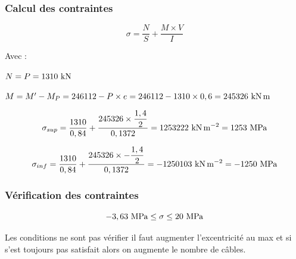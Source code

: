 \documentclass[12pt,a4paper]{article}
\newcommand{\sgma}[1]{\sigma_{#1}}
\begin{document}
	\begin{center}
	\end{center}

	
	
	
	\subsubsection{Calcul des contraintes}
	
	\[ \sigma = \dfrac{N}{S} + \dfrac{M \times V}{I} \]
	
	Avec :
	
	$N = P = 1310\kn$

	$M = M' - M_{P} = 246112 - P \times e = 246112 - 1310 \times 0,6 = 245326\knxm$
	
	\[ \sgma{sup}  = \dfrac{1310}{0,84} + \dfrac{245326 \times \dfrac{1,4}{2}}{0,1372} = 1253222\knms = 1253\mpa \]
	
	\[ \sgma{inf}  = \dfrac{1310}{0,84} + \dfrac{245326 \times -\dfrac{1,4}{2}}{0,1372} = -1250103\knms = -1250\mpa \]
	
	\subsubsection{Vérification des contraintes}
	
	\[ -3,63\mpa \leq \sigma \leq 20\mpa \]
	
	Les conditions ne sont pas vérifier il faut augmenter l'excentricité au max et si s'est toujours pas satisfait alors on augmente le nombre de câbles.
	
	
	
\end{document}
